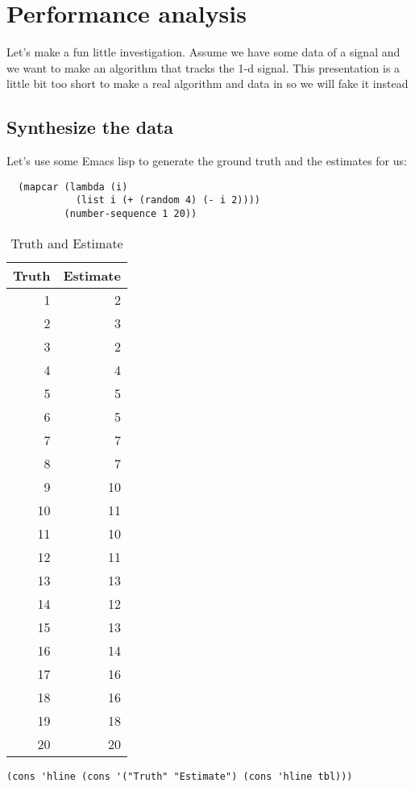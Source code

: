 \documentclass[11pt]{article}
\author{Niklas Carlsson}
\date{\today}
\title{}
\begin{document}
\section*{Performance analysis}
\label{sec:org348d1cd}
Let's make a fun little investigation. Assume we have some data of a signal and
we want to make an algorithm that tracks the 1-d signal. This presentation is a
little bit too short to make a real algorithm and data in so we will fake it
instead
\subsection*{Synthesize the data}
\label{sec:orgfcb1823}
Let's use some Emacs lisp to generate the ground truth and the estimates for us:

\begin{verbatim}
  (mapcar (lambda (i)
            (list i (+ (random 4) (- i 2))))
          (number-sequence 1 20))
\end{verbatim}

\begin{table}[htbp]
\centering
\begin{tabular}{rr}
\hline
Truth & Estimate\\
\hline
1 & 2\\
2 & 3\\
3 & 2\\
4 & 4\\
5 & 5\\
6 & 5\\
7 & 7\\
8 & 7\\
9 & 10\\
10 & 11\\
11 & 10\\
12 & 11\\
13 & 13\\
14 & 12\\
15 & 13\\
16 & 14\\
17 & 16\\
18 & 16\\
19 & 18\\
20 & 20\\
\end{tabular}
\caption{\label{tab:org033bc38}
Truth and Estimate}

\end{table}

\begin{verbatim}
(cons 'hline (cons '("Truth" "Estimate") (cons 'hline tbl)))
\end{verbatim}
\end{document}
